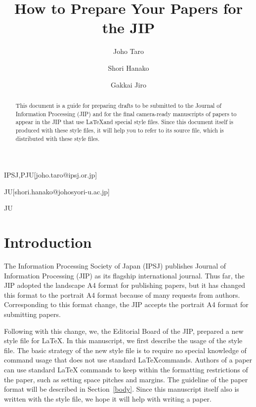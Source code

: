 \documentclass[submit,ses,english]{ipsj-lualatex} %
\begin{document}
\title{How to Prepare Your Papers for the JIP}


\author{Joho Taro}{IPSJ,PJU}[joho.taro@ipsj.or.jp]
\author{Shori Hanako}{JU}[shori.hanako@johosyori-u.ac.jp]
\author{Gakkai Jiro}{JU}

\begin{abstract}
This document is a guide for preparing drafts to be submitted to the
Journal of Information Processing (JIP) and for the final camera-ready
manuscripts of papers to appear in the JIP that use \LaTeX and special
style files.  Since this document itself is produced with these style
files, it will help you to refer to its source file, which is
distributed with these style files.
\end{abstract}


\maketitle

\section{Introduction}

The Information Processing Society of Japan (IPSJ) publishes Journal of
Information Processing (JIP) as its flagship international journal.
Thus far, the JIP adopted the landscape A4 format for publishing papers,
but it has changed this format to the portrait A4 format because of many
requests from authors.  Corresponding to this format change, the JIP
accepts the portrait A4 format for submitting papers.

Following with this change, we, the Editorial Board of the JIP, prepared
a new style file for \LaTeX\@.  In this manuscript, we first describe
the usage of the style file.  The basic strategy of the new style file
is to require no special knowledge of command usage that does not use
standard \LaTeX commands.  Authors of a paper can use standard \LaTeX
commands to keep within the formatting restrictions of the paper, such
as setting space pitches and margins.  The guideline of the paper format
will be described in Section~\ref{body}.  Since this manuscript itself
also is written with the style file, we hope it will help with writing a
paper.
\end{document}
